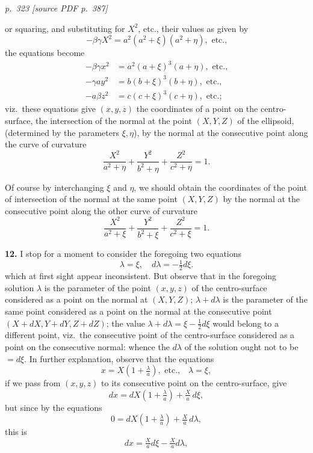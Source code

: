 \documentclass[11pt,a4paper]{article}
\newcommand{\pagemarker}[2]{\par\bigskip\noindent\textit{p.~#1 [source PDF p.~#2]}\par\smallskip}
\begin{document}
\clearpage

\pagemarker{323}{387}

or squaring, and substituting for $X^2$, etc., their values as given by
\[
-\beta\gamma X^2 = a^2(a^2 + \xi)(a^2 + \eta), \text{ etc.,}
\]
the equations become
\begin{align*}
-\beta\gamma x^2 &= a^2(a + \xi)^3(a + \eta), \text{ etc.,}\\
-\gamma a y^2 &= b(b + \xi)^3(b + \eta), \text{ etc.,}\\
-a\beta z^2 &= c(c + \xi)^3(c + \eta), \text{ etc.;}
\end{align*}
viz.\ these equations give $(x, y, z)$ the coordinates of a point on the centro-surface, the intersection of the normal at the point $(X, Y, Z)$ of the ellipsoid, (determined by the parameters $\xi, \eta$), by the normal at the consecutive point along the curve of curvature
\[
\frac{X^2}{a^2 + \eta} + \frac{Y^2}{b^2 + \eta} + \frac{Z^2}{c^2 + \eta} = 1.
\]

Of course by interchanging $\xi$ and $\eta$, we should obtain the coordinates of the point of intersection of the normal at the same point $(X, Y, Z)$ by the normal at the consecutive point along the other curve of curvature
\[
\frac{X^2}{a^2 + \xi} + \frac{Y^2}{b^2 + \xi} + \frac{Z^2}{c^2 + \xi} = 1.
\]

\textbf{12.} I stop for a moment to consider the foregoing two equations
\[
\lambda = \xi,\quad d\lambda = -\tfrac{1}{2}d\xi.
\]
which at first sight appear inconsistent. But observe that in the foregoing solution $\lambda$ is the parameter of the point $(x, y, z)$ of the centro-surface considered as a point on the normal at $(X, Y, Z)$; $\lambda + d\lambda$ is the parameter of the same point considered as a point on the normal at the consecutive point $(X + dX, Y + dY, Z + dZ)$; the value $\lambda + d\lambda = \xi - \tfrac{1}{2}d\xi$ would belong to a different point, viz.\ the consecutive point of the centro-surface considered as a point on the consecutive normal: whence the $d\lambda$ of the solution ought not to be $= d\xi$. In further explanation, observe that the equations
\[
x = X\!\left(1 + \tfrac{\lambda}{a}\right), \text{ etc.,} \quad\lambda = \xi,
\]
if we pass from $(x, y, z)$ to its consecutive point on the centro-surface, give
\[
dx = dX\!\left(1 + \tfrac{\lambda}{a}\right) + \tfrac{X}{a}\,d\xi,
\]
but since by the equations
\[
0 = dX\!\left(1 + \tfrac{\lambda}{a}\right) + \tfrac{X}{a}\,d\lambda,
\]
this is
\[
dx = \tfrac{X}{a}d\xi - \tfrac{X}{a}d\lambda,
\]
\end{document}
